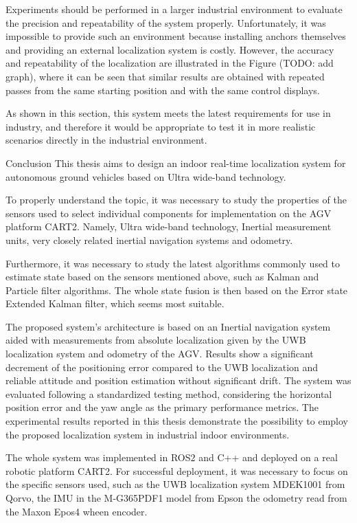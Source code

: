 	Experiments should be performed in a larger industrial environment to evaluate the precision and repeatability of the system properly. Unfortunately, it was impossible to provide such an environment because installing anchors themselves and providing an external localization system is costly. However, the accuracy and repeatability of the localization are illustrated in the Figure (TODO: add graph), where it can be seen that similar results are obtained with repeated passes from the same starting position and with the same control displays.
	
	As shown in this section, this system meets the latest requirements for use in industry, and therefore it would be appropriate to test it in more realistic scenarios directly in the industrial environment.

\sec Conclusion
This thesis aims to design an indoor real-time localization system for autonomous ground vehicles based on Ultra wide-band technology.

To properly understand the topic, it was necessary to study the properties of the sensors used to select individual components for implementation on the AGV platform CART2. Namely, Ultra wide-band technology, Inertial measurement units, very closely related inertial navigation systems and odometry.

Furthermore, it was necessary to study the latest algorithms commonly used to estimate state based on the sensors mentioned above, such as Kalman and Particle filter algorithms. The whole state fusion is then based on the Error state Extended Kalman filter, which seems most suitable.

The proposed system's architecture is based on an Inertial navigation system aided with measurements from absolute localization given by the UWB localization system and odometry of the AGV. Results show a significant decrement of the positioning error compared to the UWB localization and reliable attitude and position estimation without significant drift. The system was evaluated following a standardized testing method, considering the horizontal position error and the yaw angle as the primary performance metrics. The experimental results reported in this thesis demonstrate the possibility to employ the proposed localization system in industrial indoor environments.

The whole system was implemented in ROS2 and C++ and deployed on a real robotic platform CART2. For successful deployment, it was necessary to focus on the specific sensors used, such as the UWB localization system MDEK1001 from Qorvo, the IMU in the M-G365PDF1 model from Epson the odometry read from the Maxon Epos4 wheen encoder.

